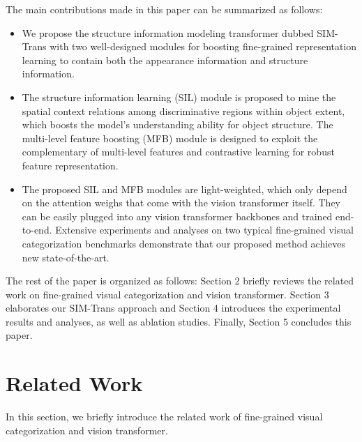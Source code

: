 \documentclass[sigconf, nonacm]{acmart}
\begin{document}
The main contributions made in this paper can be summarized as follows:
\begin{itemize}[leftmargin=30pt]

\item {We propose the structure information modeling transformer dubbed SIM-Trans with two well-designed modules for boosting fine-grained representation learning to contain both the appearance information and structure information.
}




\item {The structure information learning (SIL) module is proposed to mine the spatial context relations among discriminative regions within object extent, which boosts the model’s understanding ability for object structure. The multi-level feature boosting (MFB) module is designed to exploit the complementary of multi-level features and contrastive learning for robust feature representation.}


\item {The proposed SIL and MFB modules are light-weighted, which only depend on the attention weighs that come with the vision transformer itself. They can be easily plugged into any vision transformer backbones and trained end-to-end. Extensive experiments and analyses on two typical fine-grained visual categorization benchmarks demonstrate that our proposed method achieves new state-of-the-art.}

\end{itemize}



The rest of the paper is organized as follows: Section 2 briefly reviews the related work on fine-grained visual categorization and vision transformer. Section 3 elaborates our SIM-Trans approach and Section 4 introduces the experimental results and analyses, as well as ablation studies. Finally, Section 5 concludes this paper.









\section{Related Work}

In this section, we briefly introduce the related work of fine-grained visual categorization and vision transformer.
\end{document}
